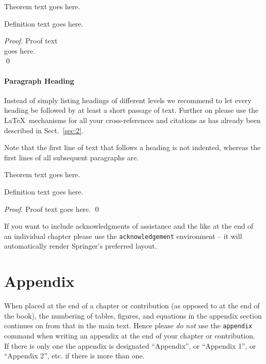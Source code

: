 \documentclass[graybox]{svmult}
\begin{document}
\begin{theorem}
Theorem text goes here.
\end{theorem}
%
%
\begin{definition}
Definition text goes here.
\end{definition}

\begin{proof}
Proof text
\\goes here.
\\
\qed
\end{proof}

\paragraph{Paragraph Heading} %
Instead of simply listing headings of different levels we recommend to
let every heading be followed by at least a short passage of text.
Further on please use the \LaTeX\ mechanisms for all your
cross-references and citations as has already been described in
Sect.~\ref{sec:2}.

Note that the first line of text that follows a heading is not indented, whereas the first lines of all subsequent paragraphs are.
%
%
\begin{theorem}
Theorem text goes here.
\end{theorem}
%
\begin{definition}
Definition text goes here.
\end{definition}
%
\begin{proof}
\smartqed
Proof text goes here.
\qed
\end{proof}
%
\begin{acknowledgement}
If you want to include acknowledgments of assistance and the like at the end of an individual chapter please use the \verb|acknowledgement| environment -- it will automatically render Springer's preferred layout.
\end{acknowledgement}
%
\section*{Appendix}
%
%
When placed at the end of a chapter or contribution (as opposed to at the end of the book),
the numbering of tables, figures, and equations in the appendix section continues on from
that in the main text. Hence please \textit{do not} use the \verb|appendix| command when
writing an appendix at the end of your chapter or contribution.
If there is only one the appendix is designated ``Appendix'', or ``Appendix 1'', or
``Appendix 2'', etc. if there is more than one.
\end{document}
